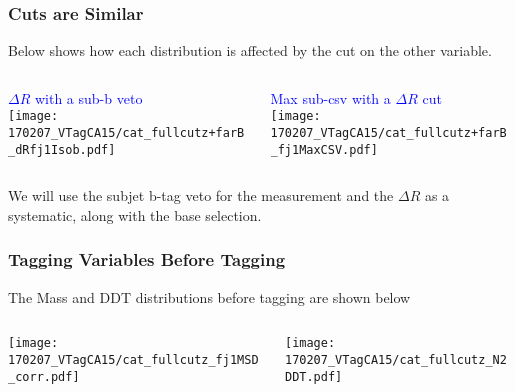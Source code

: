 \documentclass{beamer}
\begin{document}
\begin{frame}
  \frametitle{Cuts are Similar}

  Below shows how each distribution is affected by the cut on the other variable.

  \vspace{6pt}

  \begin{columns}
    \begin{column}{0.5\linewidth}
      \textcolor{blue}{$\Delta R$ with a sub-b veto} \\
      \texttt{[image: 170207\_VTagCA15/cat\_fullcutz+farB\_dRfj1Isob.pdf]}
    \end{column}
    \begin{column}{0.5\linewidth}
      \textcolor{blue}{Max sub-csv with a $\Delta R$ cut} \\
      \texttt{[image: 170207\_VTagCA15/cat\_fullcutz+farB\_fj1MaxCSV.pdf]}
    \end{column}
  \end{columns}

  \vspace{6pt}

  We will use the subjet b-tag veto for the measurement and the $\Delta R$ as a systematic,
  along with the base selection.

\end{frame}

\begin{frame}
  \frametitle{Tagging Variables Before Tagging}

  The Mass and DDT distributions before tagging are shown below

  \vspace{12pt}

  \begin{columns}
    \begin{column}{0.5\linewidth}
      \texttt{[image: 170207\_VTagCA15/cat\_fullcutz\_fj1MSD\_corr.pdf]}
    \end{column}
    \begin{column}{0.5\linewidth}
      \texttt{[image: 170207\_VTagCA15/cat\_fullcutz\_N2DDT.pdf]}
    \end{column}
  \end{columns}

\end{frame}
\end{document}
